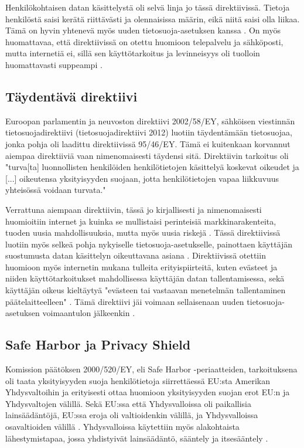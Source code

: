 \documentclass[finnish]{tktltiki}
\begin{document}
Henkilökohtaisen datan käsittelystä oli selvä linja jo tässä direktiivissä. Tietoja henkilöstä saisi kerätä riittävästi ja olennaisissa määrin, eikä niitä saisi olla liikaa. Tämä on hyvin yhtenevä myös uuden tietosuoja-asetuksen kanssa \cite{eu95,eu2016,tikkinen}. On myös huomattavaa, että direktiivissä on otettu huomioon telepalvelu ja sähköposti, mutta internetiä ei, sillä sen käyttötarkoitus ja levinneisyys oli tuolloin huomattavasti suppeampi \cite{eu95}.

\newpage
\subsection{Täydentävä direktiivi}

Euroopan parlamentin ja neuvoston direktiivi 2002/58/EY, sähköisen viestinnän tietosuojadirektiivi (tietosuojadirektiivi 2012) luotiin täydentämään tietosuojaa, jonka pohja oli laadittu direktiivissä 95/46/EY. Tämä ei kuitenkaan korvannut aiempaa direktiiviä vaan nimenomaisesti täydensi sitä. Direktiivin tarkoitus oli "turva[ta] luonnollisten henkilöiden henkilötietojen käsittelyä koskevat oikeudet ja [...] oikeutensa yksityisyyden suojaan, jotta henkilötietojen vapaa liikkuvuus yhteisössä voidaan turvata." \cite{eu2002} 

Verrattuna aiempaan direktiivin, tässä jo kirjallisesti ja nimenomaisesti huomioitiin internet ja kuinka se mullistaisi perinteisiä markkinarakenteita, tuoden uusia mahdollisuuksia, mutta myös uusia riskejä \cite{eu2002}. Tässä direktiivissä luotiin myös selkeä pohja nykyiselle tietosuoja-asetukselle, painottaen käyttäjän suostumusta datan käsittelyn oikeuttavana asiana \cite{eu2002,tikkinen}. Direktiivissä otettiin huomioon myös internetin mukana tulleita erityispiirteitä, kuten evästeet ja niiden käyttötarkoitukset mahdollisessa käyttäjän datan tallentamisessa, sekä käyttäjän oikeus kieltäytyä "evästeen tai vastaavan menetelmän tallentaminen päätelaitteelleen" \cite{eu2002}. Tämä direktiivi jäi voimaan sellaisenaan uuden tietosuoja-asetuksen voimaantulon jälkeenkin \cite{eu2016}.

\subsection{Safe Harbor ja Privacy Shield}

Komission päätöksen 2000/520/EY, eli Safe Harbor -periaatteiden, tarkoituksena oli taata yksityisyyden suoja henkilötietoja siirrettäessä EU:sta Amerikan Yhdysvaltoihin \cite{safeharbor} ja erityisesti ottaa huomioon yksityisyyden suojan erot EU:n ja Yhdysvaltojen välillä. Sekä EU:ssa että Yhdysvalloissa oli paikallisia lainsäädäntöjä, EU:ssa eroja oli valtioidenkin välillä, ja Yhdysvalloissa osavaltioiden välillä \cite{tikkinen}. Yhdysvalloissa käytettiin myös alakohtaista lähestymistapaa, jossa yhdistyivät lainsäädäntö, sääntely ja itsesääntely \cite{safeharbor}. 
\end{document}
